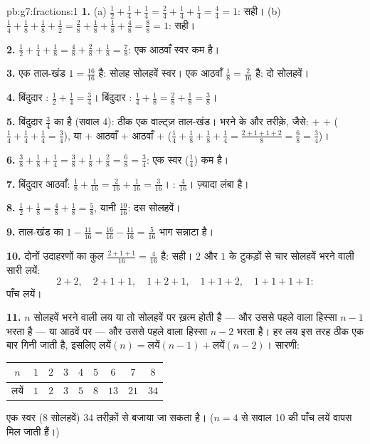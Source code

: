 \begin{solution}{pb:g7:fractions:1}
\textbf{1.} (a) $\frac12 + \frac14 + \frac14 = \frac24 + \frac14
+ \frac14 = \frac44 = 1$: सही। (b) $\frac14 + \frac18 +
\frac18 + \frac12 = \frac28 + \frac18 + \frac18 + \frac48 =
\frac88 = 1$: सही।

\textbf{2.} $\frac12 + \frac14 + \frac18 = \frac48 + \frac28 +
\frac18 = \frac78$: एक आठवाँ स्वर कम है।

\textbf{3.} एक ताल-खंड $1 = \frac{16}{16}$ है: सोलह सोलहवें स्वर।
एक आठवाँ $\frac18 = \frac{2}{16}$ है: दो सोलहवें।

\textbf{4.} बिंदुदार : $\frac12 + \frac14 = \frac34$। बिंदुदार
: $\frac14 + \frac18 = \frac28 + \frac18 = \frac38$।

\textbf{5.} बिंदुदार  $\frac34$ का है (सवाल 4): ठीक एक वाल्ट्ज़
ताल-खंड। भरने के और तरीक़े, जैसे:  $+$  $+$ 
($\frac14 + \frac14 + \frac14 = \frac34$), या  $+$ आठवाँ $+$
आठवाँ $+$  ($\frac14 + \frac18 + \frac18 + \frac14 =
\frac{2 + 1 + 1 + 2}{8} = \frac68 = \frac34$)।

\textbf{6.} $\frac38 + \frac18 + \frac14 = \frac38 + \frac18 +
\frac28 = \frac68 = \frac34$: एक  स्वर ($\frac14$) कम है।

\textbf{7.} बिंदुदार आठवाँ: $\frac18 + \frac{1}{16} =
\frac{2}{16} + \frac{1}{16} = \frac{3}{16}$। :
$\frac{4}{16}$।  ज़्यादा लंबा है।

\textbf{8.} $\frac12 + \frac18 = \frac48 + \frac18 = \frac58$,
यानी $\frac{10}{16}$: दस सोलहवें।

\textbf{9.} ताल-खंड का $1 - \frac{11}{16} = \frac{16}{16} -
\frac{11}{16} = \frac{5}{16}$ भाग सन्नाटा है।

\textbf{10.} दोनों उदाहरणों का कुल $\frac{2 + 1 + 1}{16} =
\frac{4}{16}$ है: सही। $2$ और $1$ के टुकड़ों से चार सोलहवें भरने
वाली सारी लयें:
\[
2{+}2, \quad 2{+}1{+}1, \quad 1{+}2{+}1, \quad 1{+}1{+}2, \quad
1{+}1{+}1{+}1 :
\]
पाँच लयें।

\textbf{11.} $n$ सोलहवें भरने वाली लय या तो सोलहवें पर ख़त्म होती
है --- और उससे पहले वाला हिस्सा $n - 1$ भरता है --- या आठवें पर
--- और उससे पहले वाला हिस्सा $n - 2$ भरता है। हर लय इस तरह ठीक एक
बार गिनी जाती है, इसलिए
$\text{लयें}(n) = \text{लयें}(n-1) + \text{लयें}(n-2)$। सारणी:
\begin{center}
\renewcommand{\arraystretch}{1.2}
\begin{tabular}{c|cccccccc}
$n$ & $1$ & $2$ & $3$ & $4$ & $5$ & $6$ & $7$ & $8$ \\
\hline
लयें & $1$ & $2$ & $3$ & $5$ & $8$ & $13$ & $21$ & $34$ \\
\end{tabular}
\end{center}
एक  स्वर ($8$ सोलहवें) $34$ तरीक़ों से बजाया जा सकता है।
($n = 4$ से सवाल 10 की पाँच लयें वापस मिल जाती हैं।)


\end{solution}
